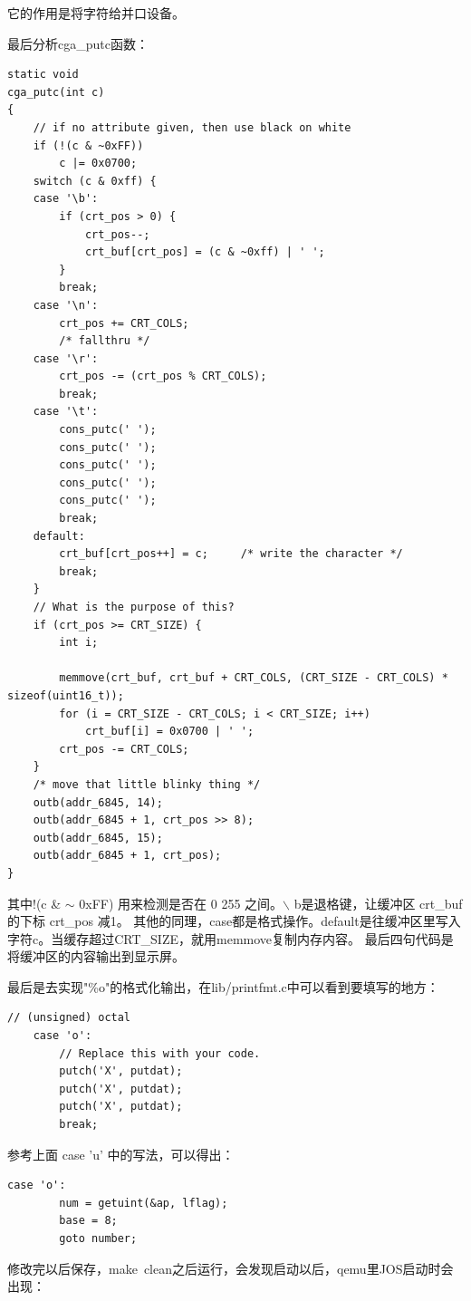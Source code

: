\documentclass[12pt,a4paper,UTF8]{article}
\begin{document}
它的作用是将字符给并口设备。

最后分析cga\_putc函数：

\begin{lstlisting}[style=CPP]
static void
cga_putc(int c)
{
	// if no attribute given, then use black on white
	if (!(c & ~0xFF))
		c |= 0x0700;
	switch (c & 0xff) {
	case '\b':
		if (crt_pos > 0) {
			crt_pos--;
			crt_buf[crt_pos] = (c & ~0xff) | ' ';
		}
		break;
	case '\n':
		crt_pos += CRT_COLS;
		/* fallthru */
	case '\r':
		crt_pos -= (crt_pos % CRT_COLS);
		break;
	case '\t':
		cons_putc(' ');
		cons_putc(' ');
		cons_putc(' ');
		cons_putc(' ');
		cons_putc(' ');
		break;
	default:
		crt_buf[crt_pos++] = c;		/* write the character */
		break;
	}
	// What is the purpose of this?
	if (crt_pos >= CRT_SIZE) {
		int i;

		memmove(crt_buf, crt_buf + CRT_COLS, (CRT_SIZE - CRT_COLS) * sizeof(uint16_t));
		for (i = CRT_SIZE - CRT_COLS; i < CRT_SIZE; i++)
			crt_buf[i] = 0x0700 | ' ';
		crt_pos -= CRT_COLS;
	}
	/* move that little blinky thing */
	outb(addr_6845, 14);
	outb(addr_6845 + 1, crt_pos >> 8);
	outb(addr_6845, 15);
	outb(addr_6845 + 1, crt_pos);
}
\end{lstlisting}

其中!(c \& $\sim$ 0xFF) 用来检测是否在 0 255 之间。$\backslash$ b是退格键，让缓冲区 crt\_buf 的下标 crt\_pos 减1。
其他的同理，case都是格式操作。default是往缓冲区里写入字符c。当缓存超过CRT\_SIZE，就用memmove复制内存内容。
最后四句代码是将缓冲区的内容输出到显示屏。

最后是去实现"\%o"的格式化输出，在lib/printfmt.c中可以看到要填写的地方：

\begin{lstlisting}[style=CPP]
    // (unsigned) octal
    case 'o':
        // Replace this with your code.
        putch('X', putdat);
        putch('X', putdat);
        putch('X', putdat);
        break;
\end{lstlisting}

参考上面 case 'u' 中的写法，可以得出：
\begin{lstlisting}[style=CPP]
    case 'o':
        num = getuint(&ap, lflag);
        base = 8;
        goto number;
\end{lstlisting}

修改完以后保存，make\ clean之后运行，会发现启动以后，qemu里JOS启动时会出现：
\end{document}
